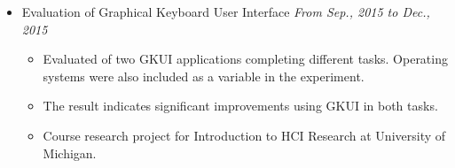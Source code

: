 \documentclass[letterpaper,11pt]{article}
\newenvironment{extra}{}{}
\begin{document}
\begin{itemize}
\begin{extra}
    \item Evaluation of Graphical Keyboard User Interface \hfill \textit{From Sep., 2015 to Dec., 2015}
    \begin{itemize}
        \item Evaluated of two GKUI applications completing different tasks. Operating systems were also
included as a variable in the experiment.
        \item The result indicates significant improvements using GKUI in both tasks.
        \item Course research project for Introduction to HCI Research at University of Michigan.
    \end{itemize}
\end{extra}

\end{itemize}
\end{document}
